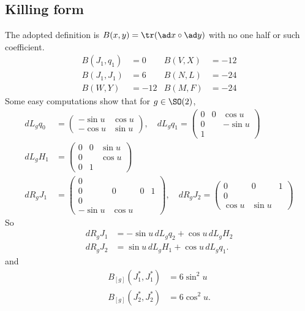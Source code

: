\subsection{Killing form}
The adopted definition is $B(x,y)=\tr(\ad x\circ\ad y)$ with no one half or such coefficient.
\begin{equation}
\begin{aligned}
B(J_1,q_1)&=0	&B(V,X)&=-12\\
B(J_1,J_1)&=6	&B(N,L)&=-24\\
B(W,Y)&=-12	&B(M,F)&=-24
\end{aligned}
\end{equation}
Some easy computations show that for $g\in \SO(2)$,
\[
\begin{split}
dL_gq_0&=
\begin{pmatrix}
-\sin u&\cos u\\
-\cos u&\sin u
\end{pmatrix},
\quad
dL_g q_1=
\begin{pmatrix}
0&0&\cos u\\
0&&-\sin u\\
1
\end{pmatrix}\\
dL_g H_1&=
\begin{pmatrix}
0&0&\sin u\\
0&&\cos u\\
0&1
\end{pmatrix}\\
dR_g J_1&=
\begin{pmatrix}
0\\
0&0&0&1\\
0\\
-\sin u&\cos u
\end{pmatrix},
\quad
dR_g J_2=
\begin{pmatrix}
0&0&1\\
0\\
\cos u&\sin u
\end{pmatrix}
\end{split}
\]
So
\begin{subequations}
\begin{align}
dR_g J_1&=-\sin u\, dL_g q_2+\cos u\, dL_g H_2\\
dR_g J_2&=\sin u\, dL_g H_1+\cos u\, dL_g q_1.
\end{align}
\end{subequations}
and
\begin{subequations}
\begin{align}
  B_{[g]}(J_1^*,J_1^*)&=6\sin^2 u\\
B_{[g]}(J_2^*,J_2^*)&=6\cos^2 u.
\end{align}
\end{subequations}


